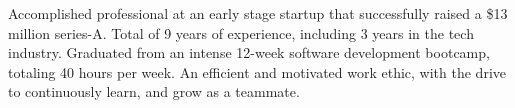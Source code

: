
{
Accomplished professional at an early stage startup that successfully raised a \$13 million series-A.
Total of 9 years of experience, including 3 years in the tech industry.
Graduated from an intense 12-week software development bootcamp, totaling 40 hours per week.
An efficient and motivated work ethic, with the drive to continuously learn, and grow as a teammate.
}